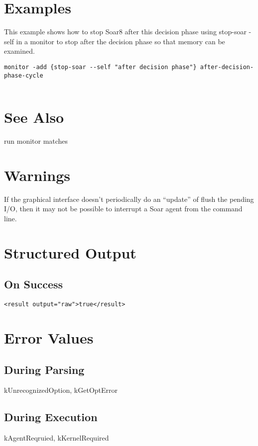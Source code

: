 \documentclass[10pt]{article}
\begin{document}
\section*{ Examples }


 This example shows how to stop Soar8 after this decision phase using stop-soar -self in a monitor to stop after the decision phase so that memory can be examined. \begin{verbatim}
monitor -add {stop-soar --self "after decision phase"} after-decision-phase-cycle


\end{verbatim}

\section*{ See Also }


 run monitor matches
\section*{ Warnings }


 If the graphical interface doesn't periodically do an ``update'' of flush the pending I/O, then it may not be possible to interrupt a Soar agent from the command line. 
\section*{ Structured Output }
\subsection*{ On Success }
\begin{verbatim}
<result output="raw">true</result>

\end{verbatim}
\section*{ Error Values }
\subsection*{ During Parsing }


 kUnrecognizedOption, kGetOptError
\subsection*{ During Execution }


 kAgentReqruied, kKernelRequired
\end{document}
